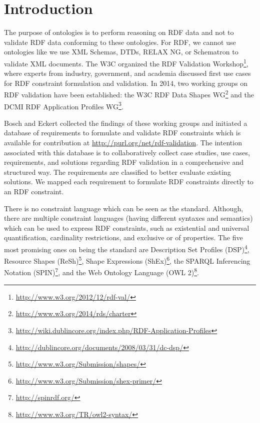 \documentclass{llncs}
\begin{document}

\section{Introduction}

The purpose of ontologies is to perform reasoning on RDF data and not to validate RDF data conforming to these ontologies.
For RDF, we cannot use ontologies like we use XML Schemas, DTDs, RELAX NG, or Schematron to validate XML documents.
The W3C organized the RDF Validation Workshop\footnote{\url{http://www.w3.org/2012/12/rdf-val/}}, 
where experts from industry, government, and academia discussed first use cases for RDF constraint formulation and validation.
In 2014, two working groups on RDF validation have been established: 
the W3C RDF Data Shapes WG\footnote{\url{http://www.w3.org/2014/rds/charter}} and the DCMI RDF Application Profiles WG\footnote{\url{http://wiki.dublincore.org/index.php/RDF-Application-Profiles}}. 

Bosch and Eckert \cite{BoschEckert2014} collected the findings of these working groups and initiated a database of requirements to formulate and validate RDF constraints
which is available for contribution at \url{http://purl.org/net/rdf-validation}.
The intention associated with this database is to collaboratively collect case studies, use cases, requirements, and solutions regarding RDF validation in a comprehensive and structured way. 
The requirements are classified to better evaluate existing solutions. 
We mapped each requirement to formulate RDF constraints directly to an RDF constraint.

There is no constraint language which can be seen as the standard.
Although, there are multiple constraint languages (having different syntaxes and semantics) which can be used to express RDF constraints, such as existential and universal quantification, cardinality restrictions, and exclusive or of properties.
The five most promising ones on being the standard are
Description Set Profiles (DSP)\footnote{\url{http://dublincore.org/documents/2008/03/31/dc-dsp/}},
Resource Shapes (ReSh)\footnote{\url{http://www.w3.org/Submission/shapes/}}, 
Shape Expressions (ShEx)\footnote{\url{http://www.w3.org/Submission/shex-primer/}},
the SPARQL Inferencing Notation (SPIN)\footnote{\url{http://spinrdf.org/}}, 
and the Web Ontology Language (OWL 2)\footnote{\url{http://www.w3.org/TR/owl2-syntax/}}.

\end{document}
